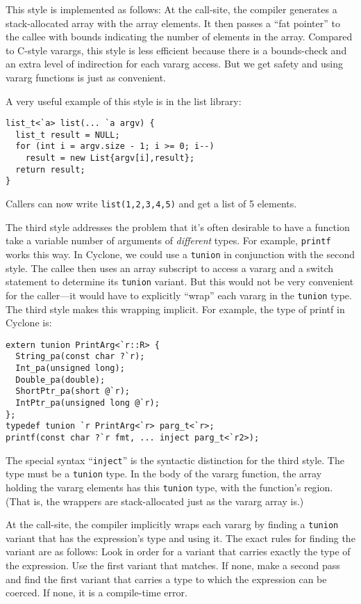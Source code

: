 This style is implemented as follows: At the call-site, the compiler
generates a stack-allocated array with the array elements.  It then
passes a ``fat pointer'' to the callee with bounds indicating the
number of elements in the array.  Compared to C-style varargs, this
style is less efficient because there is a bounds-check and an extra
level of indirection for each vararg access.  But we get safety and
using vararg functions is just as convenient.

A very useful example of this style is in the list library:
\begin{verbatim}
list_t<`a> list(... `a argv) {
  list_t result = NULL;
  for (int i = argv.size - 1; i >= 0; i--) 
    result = new List{argv[i],result};
  return result;
}
\end{verbatim}
Callers can now write \texttt{list(1,2,3,4,5)} and get a list of 5
elements.

The third style addresses the problem that it's often desirable to
have a function take a variable number of arguments of
\emph{different} types.  For example, \texttt{printf} works this way.
In Cyclone, we could use a \texttt{tunion} in conjunction with the
second style.  The callee then uses an array subscript to access a
vararg and a switch statement to determine its \texttt{tunion}
variant.  But this would not be very convenient for the caller---it
would have to explicitly ``wrap'' each vararg in the \texttt{tunion}
type.  The third style makes this wrapping implicit.  For example, the
type of printf in Cyclone is:

\begin{verbatim}
extern tunion PrintArg<`r::R> {
  String_pa(const char ?`r);
  Int_pa(unsigned long);
  Double_pa(double);
  ShortPtr_pa(short @`r);
  IntPtr_pa(unsigned long @`r);
};
typedef tunion `r PrintArg<`r> parg_t<`r>;
printf(const char ?`r fmt, ... inject parg_t<`r2>);
\end{verbatim}

The special syntax ``\texttt{inject}'' is the syntactic distinction
for the third style.  The type must be a \texttt{tunion} type.  In the
body of the vararg function, the array holding the vararg elements has
this \texttt{tunion} type, with the function's region.  (That is, the
wrappers are stack-allocated just as the vararg array is.)

At the call-site, the compiler implicitly wraps each vararg by finding
a \texttt{tunion} variant that has the expression's type and using
it.  The exact rules for finding the variant are as follows:  Look in
order for a variant that carries exactly the type of the expression.
Use the first variant that matches.  If none, make a second pass and
find the first variant that carries a type to which the expression can
be coerced.  If none, it is a compile-time error.

